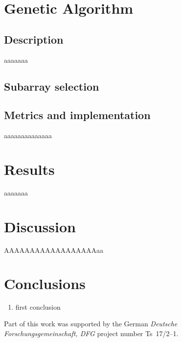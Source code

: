 \documentclass{aa}
\begin{document}
\section{Genetic Algorithm}
\label{secGA}




\subsection{Description}

aaaaaaa
\subsection{Subarray selection}


\subsection{Metrics and implementation}

aaaaaaaaaaaaaa

\section{Results}
\label{secRes}


aaaaaaa


\section{Discussion}
\label{secDiscussion}

AAAAAAAAAAAAAAAAAAaa



\section{Conclusions}

   \begin{enumerate}
      \item first conclusion
   \end{enumerate}

\begin{acknowledgements}
      Part of this work was supported by the German
      \emph{Deut\-sche For\-schungs\-ge\-mein\-schaft, DFG\/} project
      number Ts~17/2--1.
\end{acknowledgements}
\end{document}
